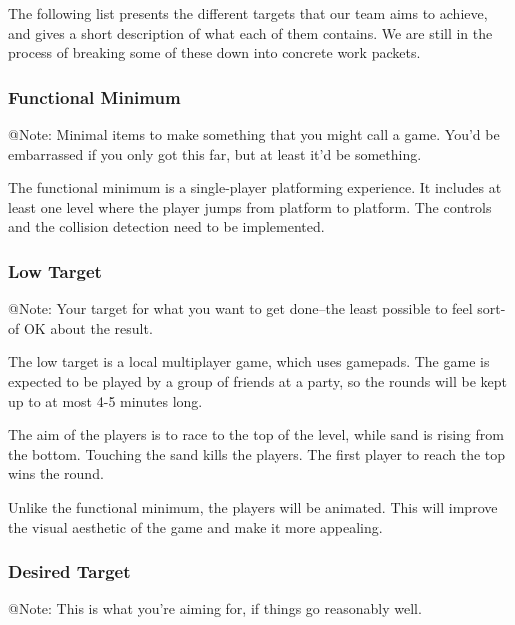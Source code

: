 The following list presents the different targets that our team aims to achieve, and gives a short description of what each of them contains. We are still in the process of breaking some of these down into concrete work packets.

\subsubsection{Functional Minimum}

\begin{TempText}
	@Note: Minimal items to make something that you might call a game. You'd be embarrassed if you only got this far, but at least it'd be something.
\end{TempText}

The functional minimum is a single-player platforming experience. It includes at least one level where the player jumps from platform to platform. The controls and the collision detection need to be implemented.

\subsubsection{Low Target}

\begin{TempText}
	@Note: Your target for what you want to get done--the least possible to feel sort-of OK about the result.
\end{TempText}

The low target is a local multiplayer game, which uses gamepads. The game is expected to be played by a group of friends at a party, so the rounds will be kept up to at most 4-5 minutes long.
    
The aim of the players is to race to the top of the level, while sand is rising from the bottom. Touching the sand kills the players. The first player to reach the top wins the round.
    
Unlike the functional minimum, the players will be animated. This will improve the visual aesthetic of the game and make it more appealing.

\subsubsection{Desired Target}

\begin{TempText}
	@Note: This is what you're aiming for, if things go reasonably well.
\end{TempText}

